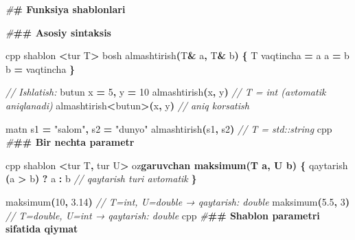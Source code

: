 \documentclass[a4paper,11pt,twoside,openright]{book}
\newenvironment{Shaded}{\begin{snugshade}}{\end{snugshade}}
\newcommand{\CharTok}[1]{\textcolor[rgb]{0.31,0.60,0.02}{#1}}
\newcommand{\CommentTok}[1]{\textcolor[rgb]{0.56,0.35,0.01}{\textit{#1}}}
\newcommand{\DecValTok}[1]{\textcolor[rgb]{0.00,0.00,0.81}{#1}}
\newcommand{\ErrorTok}[1]{\textcolor[rgb]{0.64,0.00,0.00}{\textbf{#1}}}
\newcommand{\FloatTok}[1]{\textcolor[rgb]{0.00,0.00,0.81}{#1}}
\newcommand{\NormalTok}[1]{#1}
\newcommand{\OperatorTok}[1]{\textcolor[rgb]{0.81,0.36,0.00}{\textbf{#1}}}
\newcommand{\PreprocessorTok}[1]{\textcolor[rgb]{0.56,0.35,0.01}{\textit{#1}}}
\newcommand{\StringTok}[1]{\textcolor[rgb]{0.31,0.60,0.02}{#1}}
\begin{document}
\begin{Shaded}
\begin{Highlighting}[]
\PreprocessorTok{\#}\ErrorTok{\# Funksiya shablonlari}

\PreprocessorTok{\#}\ErrorTok{\#\# Asosiy sintaksis}

\ErrorTok{\textasciigrave{}\textasciigrave{}\textasciigrave{}}\NormalTok{cpp}
\NormalTok{shablon }\OperatorTok{\textless{}}\NormalTok{tur T}\OperatorTok{\textgreater{}}
\NormalTok{bosh almashtirish}\OperatorTok{(}\NormalTok{T}\OperatorTok{\&}\NormalTok{ a}\OperatorTok{,}\NormalTok{ T}\OperatorTok{\&}\NormalTok{ b}\OperatorTok{)} \OperatorTok{\{}
\NormalTok{    T vaqtincha }\OperatorTok{=}\NormalTok{ a}
\NormalTok{    a }\OperatorTok{=}\NormalTok{ b}
\NormalTok{    b }\OperatorTok{=}\NormalTok{ vaqtincha}
\OperatorTok{\}}

\CommentTok{// Ishlatish:}
\NormalTok{butun x }\OperatorTok{=} \DecValTok{5}\OperatorTok{,}\NormalTok{ y }\OperatorTok{=} \DecValTok{10}
\NormalTok{almashtirish}\OperatorTok{(}\NormalTok{x}\OperatorTok{,}\NormalTok{ y}\OperatorTok{)}              \CommentTok{// T = int (avtomatik aniqlanadi)}
\NormalTok{almashtirish}\OperatorTok{\textless{}}\NormalTok{butun}\OperatorTok{\textgreater{}(}\NormalTok{x}\OperatorTok{,}\NormalTok{ y}\OperatorTok{)}       \CommentTok{// aniq ko\textquotesingle{}rsatish}

\NormalTok{matn s1 }\OperatorTok{=} \StringTok{"salom"}\OperatorTok{,}\NormalTok{ s2 }\OperatorTok{=} \StringTok{"dunyo"}
\NormalTok{almashtirish}\OperatorTok{(}\NormalTok{s1}\OperatorTok{,}\NormalTok{ s2}\OperatorTok{)}            \CommentTok{// T = std::string}
\ErrorTok{\textasciigrave{}\textasciigrave{}\textasciigrave{}}\NormalTok{cpp}
\PreprocessorTok{\#}\ErrorTok{\#\# Bir nechta parametr}

\ErrorTok{\textasciigrave{}\textasciigrave{}\textasciigrave{}}\NormalTok{cpp}
\NormalTok{shablon }\OperatorTok{\textless{}}\NormalTok{tur T}\OperatorTok{,}\NormalTok{ tur U}\OperatorTok{\textgreater{}}
\NormalTok{o}\CharTok{\textquotesingle{}z}\ErrorTok{garuvchan maksimum(T a, U b) \{}
\NormalTok{    qaytarish }\OperatorTok{(}\NormalTok{a }\OperatorTok{\textgreater{}}\NormalTok{ b}\OperatorTok{)} \OperatorTok{?}\NormalTok{ a }\OperatorTok{:}\NormalTok{ b    }\CommentTok{// qaytarish turi avtomatik}
\OperatorTok{\}}

\NormalTok{maksimum}\OperatorTok{(}\DecValTok{10}\OperatorTok{,} \FloatTok{3.14}\OperatorTok{)}    \CommentTok{// T=int, U=double → qaytarish: double}
\NormalTok{maksimum}\OperatorTok{(}\FloatTok{5.5}\OperatorTok{,} \DecValTok{3}\OperatorTok{)}      \CommentTok{// T=double, U=int → qaytarish: double}
\ErrorTok{\textasciigrave{}\textasciigrave{}\textasciigrave{}}\NormalTok{cpp}
\PreprocessorTok{\#}\ErrorTok{\#\# Shablon parametri sifatida qiymat}


\end{Highlighting}
\end{Shaded}
\end{document}
